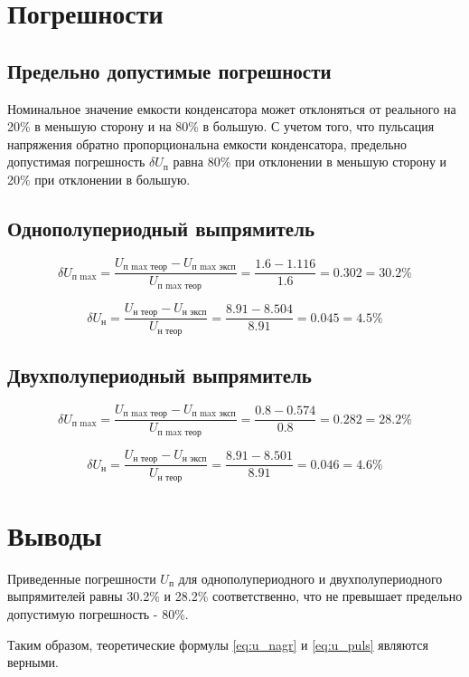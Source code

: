 \documentclass[a4paper,14pt]{extarticle}
\begin{document}
\section{Погрешности}

\subsection{Предельно допустимые погрешности}

Номинальное значение емкости конденсатора может отклоняться от реального на 20\% в меньшую сторону и на 80\% в большую. С учетом того, что пульсация напряжения обратно пропорциональна емкости конденсатора, предельно допустимая погрешность $\delta U_\text{п}$ равна 80\% при отклонении в меньшую сторону и 20\% при отклонении в большую.

\subsection{Однополупериодный выпрямитель}

\[
\delta U_\text{п max} = \frac{U_\text{п max\ \ теор} - U_\text{п max\ \ эксп}}{U_\text{п max\ \ теор}} = \frac{1.6 - 1.116}{1.6} = 0.302 = 30.2 \%
\]

\[
\delta U_\text{н} = \frac{U_\text{н\ \ теор} - U_\text{н\ \ эксп}}{U_\text{н\ \ теор}} = \frac{8.91 - 8.504}{8.91} = 0.045 = 4.5 \%
\]

\subsection{Двухполупериодный выпрямитель}

\[
\delta U_\text{п max} = \frac{U_\text{п max\ \ теор} - U_\text{п max\ \ эксп}}{U_\text{п max\ \ теор}} = \frac{0.8 - 0.574}{0.8} = 0.282 = 28.2 \%
\]

\[
\delta U_\text{н} = \frac{U_\text{н\ \ теор} - U_\text{н\ \ эксп}}{U_\text{н\ \ теор}} = \frac{8.91 - 8.501}{8.91} = 0.046 = 4.6 \%
\]

\section{Выводы}

Приведенные погрешности $U_\text{п}$ для однополупериодного и двухполупериодного выпрямителей равны 30.2\% и 28.2\% соответственно, что не превышает предельно допустимую погрешность - 80\%.

Таким образом, теоретические формулы \ref{eq:u_nagr} и \ref{eq:u_puls} являются верными.
\end{document}
